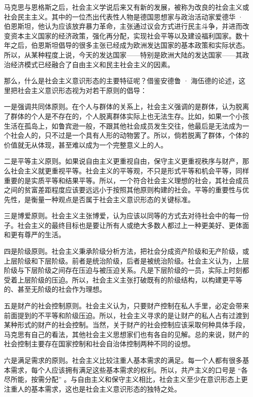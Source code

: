 马克思与恩格斯之后，社会主义学说后来又有新的发展，被称为改良的社会主义或社会民主主义。其中的一位杰出代表性人物是德国思想家与政治活动家爱德华 · 伯恩斯坦，他认为应该放弃暴力革命，主张通过议会方式进行民主斗争，并进而改变资本主义国家的经济政策，强化再分配，实现社会平等以及建设福利国家。数十年之后，伯恩斯坦倡导的很多主张已经成为欧洲发达国家的基本政策和实际状态。所以，从某种程度上说，今天的发达国家——特别是欧洲大陆的发达国家——其政治经济模式已经融合了自由主义和民主社会主义的因素。

那么，什么是社会主义意识形态的主要特征呢？借鉴安德鲁 · 海伍德的论述，这里把社会主义意识形态视为对若干原则的倡导：

一是强调共同体原则。在个人与群体的关系上，社会主义强调的是群体，认为脱离了群体的个人是不存在的，个人脱离群体实际上也无法生存。比如，如果一个小孩生活在孤岛上，如鲁宾逊一般，不跟其他社会成员发生交往，他最后是无法成为一个社会人的，只不过是一个具有人形的动物罢了。所以，倘若脱离了群体，个体的价值就无从体现，甚至难以成为一个完整意义上的人。

二是平等主义原则。如果说自由主义更重视自由，保守主义更重视秩序与财产，那么社会主义就更重视平等。社会主义的平等观，不只是形式平等和机会平等，同样重要的是实质平等和结果平等。所以，一个符合社会主义理想的社会，其社会成员之间的贫富差距程度应该要远远小于按照其他原则构建的社会。平等的重要性与优先性，是衡量一种观点是否属于社会主义意识形态的关键标准。

三是博爱原则。社会主义主张博爱，认为应该以同等的方式去对待社会中的每一份子。社会主义的最终目标也是要让所有人或绝大多数人都过上一种更美好、更体面和更有尊严的生活。

四是阶级原则。社会主义秉承阶级分析方法，把社会分成资产阶级和无产阶级，或上层阶级和下层阶级。前者是统治阶级，后者是被统治阶级。社会主义认为，上层阶级与下层阶级之间存在压迫与被压迫关系。凡是下层阶级的一员，实际上时刻都受着上层阶级的压迫。所以，社会主义主张打破既有的阶级结构，以构建更平等的、甚至无阶级的社会作为理想。

五是财产的社会控制原则。社会主义认为，只要财产控制在私人手里，必定会带来前面提到的不平等和阶级压迫。所以，社会主义寻求的是让财产的私人占有过渡到某种形式的财产的社会控制。当然，关于财产的社会控制应该采取何种具体手段，马克思有自己的看法，其他社会主义思想家们也有各自的见解。总的来说，财产的社会控制主要存在国家控制和社会自治体控制两种不同的设想。

六是满足需求的原则。社会主义比较注重人基本需求的满足。每一个人都有很多基本需求，每个人应该拥有满足这些基本需求的权利。所以，共产主义的口号是 “各尽所能，按需分配” 。与自由主义和保守主义相比，社会主义至少在意识形态上更注重人的基本需求，这也是社会主义意识形态的独特之处。

